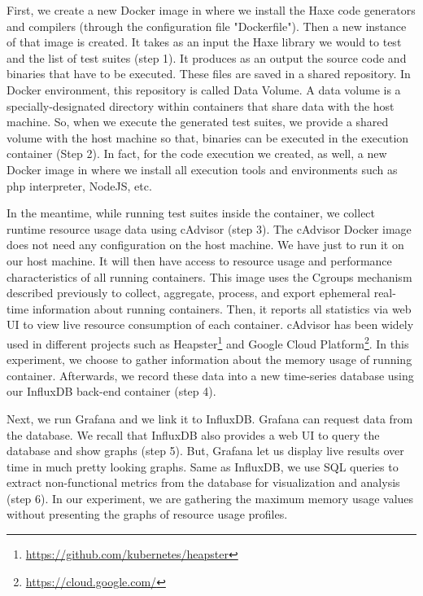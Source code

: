  

First, we create a new Docker image in where we install the Haxe code generators and compilers (through the configuration file "Dockerfile"). Then a new instance of that image is created. It takes as an input the Haxe library we would to test and the list of test suites (step 1). It produces as an output the source code and binaries that have to be executed. These files are saved in a shared repository.
In Docker environment, this repository is called Data Volume. A data volume is a specially-designated directory within containers that share data with the host machine. So, when
we execute the generated test suites, we provide a shared volume with
the host machine so that, binaries can be executed in the execution container (Step 2). In fact, for the code execution we created, as well, a new Docker image in where we install all execution tools and environments such as php interpreter, NodeJS, etc. 

In the meantime, while running test suites inside the container, we collect runtime resource usage data using cAdvisor (step 3). The cAdvisor Docker image does not need any configuration on the host machine. We have just to run it on our host machine. It will then have access to resource usage and performance characteristics of all running containers. This image uses the Cgroups mechanism described previously to collect, aggregate, process, and export ephemeral real-time information about running containers. Then, it reports all statistics via web UI to view live resource consumption of each container. cAdvisor has been widely used in different projects such as Heapster\footnote{\url{https://github.com/kubernetes/heapster}} and Google Cloud Platform\footnote{\url{https://cloud.google.com/}}. In this experiment, we choose to gather information about the memory usage of running container.
Afterwards, we record these data into a new time-series database using our InfluxDB back-end container (step 4). %

Next, we run Grafana and we link it to InfluxDB. %
Grafana can  request data from the database. We recall that InfluxDB also provides a web UI to query the database and show graphs (step 5). But, Grafana let us display live results over time in much pretty looking graphs. Same as InfluxDB, we use SQL queries to extract non-functional metrics from the database for visualization and analysis (step 6). In our experiment, we are gathering the maximum memory usage values without presenting the graphs of resource usage profiles.

